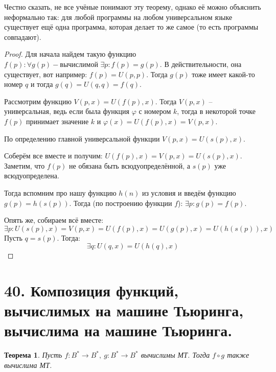 \documentclass[a4paper, 12pt]{article}
\newtheorem*{theorem}{Теорема}
\begin{document}
Честно сказать, не все учёные понимают эту теорему, однако её можно объяснить неформально
так: для любой программы на любом универсальном языке существует ещё одна программа,
которая делает то же самое (то есть программы совпадают).

\begin{proof}
    Для начала найдем такую функцию $f(p): \forall g(p) - \text{вычислимой } 
    \exists p: f(p) = g(p)$. В действительности, она существует, вот например:
    $f(p) = U(p, p)$. Тогда $g(p)$ тоже имеет какой-то номер $q$ и тогда
    $g(q) = U(q, q) = f(q)$.

    Рассмотрим функцию $V(p, x) = U(f(p), x)$. Тогда $V(p, x)$ -- универсальная,
    ведь если была функция $\varphi$ с номером $k$, тогда в некоторой точке $f(p)$
    принимает значение $k$ и $\varphi(x) = U(f(p), x) = V(p, x)$. 
    
    По определению главной универсальной функции $V(p, x) = U(s(p), x)$.

    Соберём все вместе и получим: $U(f(p), x) = V(p, x) = U(s(p), x)$. Заметим,
    что $f(p)$ не обязана быть всюдуопределённой, а $s(p)$ уже всюдуопределена.

    Тогда вспомним про нашу функцию $h(n)$ из условия и введём функцию $g(p) = h(s(p))$.
    Тогда (по построению функции $f$): $\exists p : g(p) = f(p)$.

    Опять же, собираем всё вместе:
    \[
    \exists p : U(s(p), x) = V(p, x) = U(f(p), x) = U(g(p), x) = U(h(s(p)), x)
    \]
    Пусть $q = s(p)$. Тогда:
    \[
    \exists q : U(q, x) = U(h(q), x)
    \]
\end{proof}

\section*{40. Композиция функций, вычислимых на машине Тьюринга, вычислима на машине Тьюринга.}

\begin{theorem}
    Пусть $f : B^{*} \to B^{*},\ g : B^{*} \to B^{*}$ вычислимы МТ. Тогда $f \circ g$ также вычислима МТ.
\end{theorem}
\end{document}
